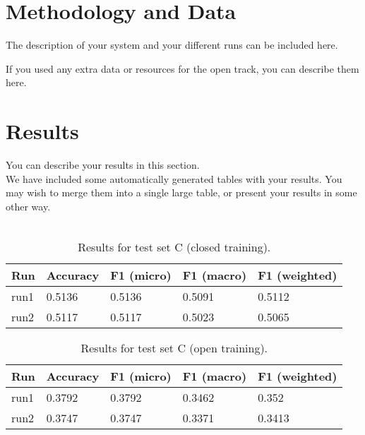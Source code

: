 \documentclass[11pt]{article}
\begin{document}
\section{Methodology and Data}

The description of your system and your different runs can be included here.

If you used any extra data or resources for the open track, you can describe them here.

\section{Results}
\label{sec:results}

You can describe your results in this section.
\\

We have included some automatically generated tables with your results. You may wish to merge them into a single large table, or present your results in some other way.
\\\\

\begin{table}[ht]
\center
\begin{tabular}{|lllll|}
\hline
\bf Run & \bf Accuracy & \bf F1 (micro) & \bf F1 (macro) & \bf F1 (weighted) \\
\hline
run1 & 0.5136 & 0.5136 & 0.5091 & 0.5112 \\
run2 & 0.5117 & 0.5117 & 0.5023 & 0.5065 \\
\hline
\end{tabular}
\caption{Results for test set C (closed training).}
\label{tab:results-C-closed}
\end{table}

\begin{table}[ht]
\center
\begin{tabular}{|lllll|}
\hline
\bf Run & \bf Accuracy & \bf F1 (micro) & \bf F1 (macro) & \bf F1 (weighted) \\
\hline
run1 & 0.3792 & 0.3792 & 0.3462 & 0.352 \\
run2 & 0.3747 & 0.3747 & 0.3371 & 0.3413 \\
\hline
\end{tabular}
\caption{Results for test set C (open training).}
\label{tab:results-C-open}
\end{table}
\end{document}
